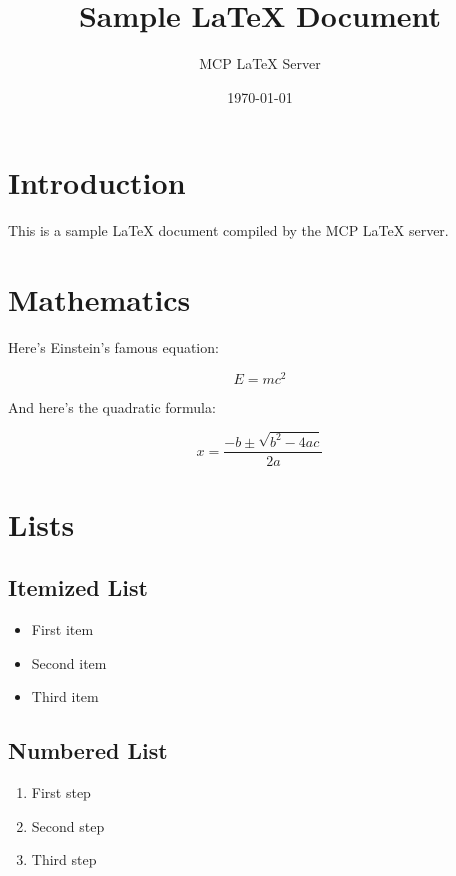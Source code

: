 \documentclass{article}
\title{Sample LaTeX Document}
\author{MCP LaTeX Server}
\date{\today}
\begin{document}
\maketitle

\section{Introduction}

This is a sample LaTeX document compiled by the MCP LaTeX server.

\section{Mathematics}

Here's Einstein's famous equation:

\begin{equation}
E = mc^2
\end{equation}

And here's the quadratic formula:

\begin{equation}
x = \frac{-b \pm \sqrt{b^2 - 4ac}}{2a}
\end{equation}

\section{Lists}

\subsection{Itemized List}

\begin{itemize}
    \item First item
    \item Second item
    \item Third item
\end{itemize}

\subsection{Numbered List}

\begin{enumerate}
    \item First step
    \item Second step
    \item Third step
\end{enumerate}
\end{document}
